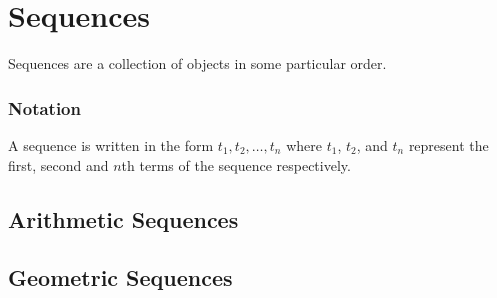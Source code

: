 \section{Sequences}

Sequences are a collection of objects in some particular order.

\subsubsection{Notation}

A sequence is written in the form $t_1, t_2, \dots, t_n$ where $t_1$, $t_2$, and $t_n$ represent the first, second and $n$th terms of the sequence respectively. \\


\subsection{Arithmetic Sequences}





\subsection{Geometric Sequences}



